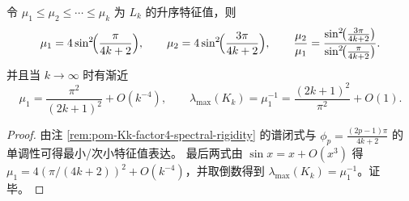 



\begin{corollary}[谱隙常数的完全显式化]\label{cor:pom-Lk-gap-pi2}
令 \(\mu_1\le\mu_2\le\cdots\le\mu_k\) 为 \(L_k\) 的升序特征值，则
\[
\mu_1=4\sin^2\!\Bigl(\frac{\pi}{4k+2}\Bigr),
\qquad
\mu_2=4\sin^2\!\Bigl(\frac{3\pi}{4k+2}\Bigr),
\qquad
\frac{\mu_2}{\mu_1}=\frac{\sin^2\!\bigl(\frac{3\pi}{4k+2}\bigr)}{\sin^2\!\bigl(\frac{\pi}{4k+2}\bigr)}.
\]
并且当 \(k\to\infty\) 时有渐近
\[
\mu_1=\frac{\pi^2}{(2k+1)^2}+O(k^{-4}),
\qquad
\lambda_{\max}(K_k)=\mu_1^{-1}=\frac{(2k+1)^2}{\pi^2}+O(1).
\]
\end{corollary}
\begin{proof}
由注 \ref{rem:pom-Kk-factor4-spectral-rigidity} 的谱闭式与 \(\phi_p=\frac{(2p-1)\pi}{4k+2}\) 的单调性可得最小/次小特征值表达。
最后两式由 \(\sin x=x+O(x^3)\) 得 \(\mu_1=4(\pi/(4k+2))^2+O(k^{-4})\)，并取倒数得到 \(\lambda_{\max}(K_k)=\mu_1^{-1}\)。证毕。
\end{proof}

